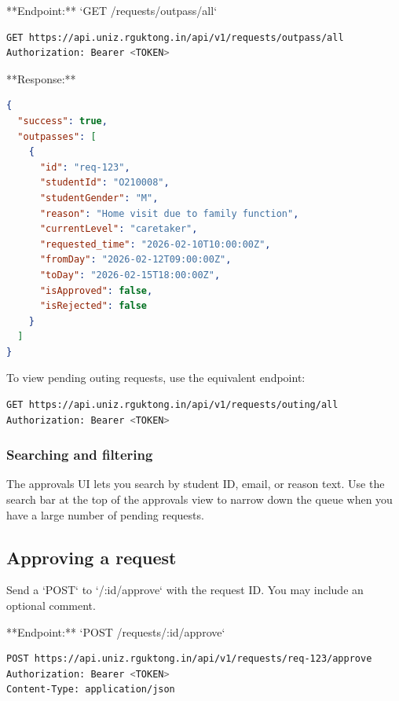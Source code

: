 **Endpoint:** `GET /requests/outpass/all`

\begin{lstlisting}[language=bash]
GET https://api.uniz.rguktong.in/api/v1/requests/outpass/all
Authorization: Bearer <TOKEN>

\end{lstlisting}

**Response:**

\begin{lstlisting}[language=json]
{
  "success": true,
  "outpasses": [
    {
      "id": "req-123",
      "studentId": "O210008",
      "studentGender": "M",
      "reason": "Home visit due to family function",
      "currentLevel": "caretaker",
      "requested_time": "2026-02-10T10:00:00Z",
      "fromDay": "2026-02-12T09:00:00Z",
      "toDay": "2026-02-15T18:00:00Z",
      "isApproved": false,
      "isRejected": false
    }
  ]
}

\end{lstlisting}

To view pending outing requests, use the equivalent endpoint:

\begin{lstlisting}[language=bash]
GET https://api.uniz.rguktong.in/api/v1/requests/outing/all
Authorization: Bearer <TOKEN>

\end{lstlisting}

\subsubsection{Searching and filtering}

The approvals UI lets you search by student ID, email, or reason text. Use the search bar at the top of the approvals view to narrow down the queue when you have a large number of pending requests.

\subsection{Approving a request}

Send a `POST` to `/:id/approve` with the request ID. You may include an optional comment.

**Endpoint:** `POST /requests/:id/approve`

\begin{lstlisting}[language=bash]
POST https://api.uniz.rguktong.in/api/v1/requests/req-123/approve
Authorization: Bearer <TOKEN>
Content-Type: application/json

\end{lstlisting}

